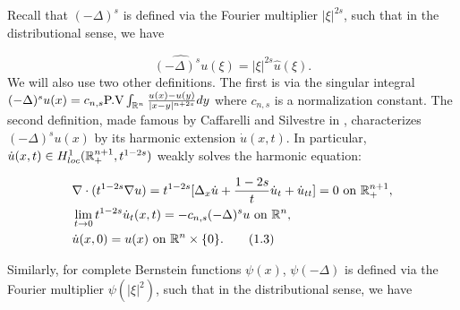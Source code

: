 \documentclass{article}
\begin{document}
\indent


Recall that $(-\Delta)^s$ is defined via the Fourier multiplier $|\xi|^{2s}$, such that in the distributional sense, we have

$$
\widehat{(-\Delta)^s u} (\xi) = |\xi|^{2s}\hat{u}(\xi).
$$
We will also use two other definitions. The first is via the singular integral $(-\Delta)^s u(x) = c_{n,s} \textrm{P.V} \int_{\mathbb{R}^n} \frac{u(x)-u(y)}{|x-y|^{n+2s}}dy$ where $c_{n,s}$ is a normalization constant. The second definition, made famous by Caffarelli and Silvestre in \cite{cs}, characterizes $(-\Delta)^s u(x)$ by its harmonic extension $\dot{u}(x,t)$. In particular, $\dot{u}(x,t) \in H^1_{loc}(\mathbb{R}^{n+1}_+, t^{1-2s})$ weakly solves the harmonic equation:

\begin{align*}
    & \nabla \cdot (t^{1-2s} \nabla u) = t^{1-2s}[ \Delta_x \dot{u} + \frac{1-2s}{t} \dot{u}_t + \dot{u}_{tt}] = 0 \textrm{ on } \mathbb{R}^{n+1}_{+}, \\
    & \lim_{t \to 0} t^{1-2s} \dot{u}_t(x,t) = -c_{n,s}(-\Delta)^s u \textrm{ on } \mathbb{R}^n, \\
    & \dot{u}(x,0) = u(x) \textrm{ on } \mathbb{R}^n \times \{0\}.
    \tag{1.3} \label{eq: 1.3}
\end{align*}

Similarly, for complete Bernstein functions $\psi(x)$, $\psi(-\Delta)$ is defined via the Fourier multiplier $\psi(|\xi|^2)$, such that in the distributional sense, we have
\end{document}

